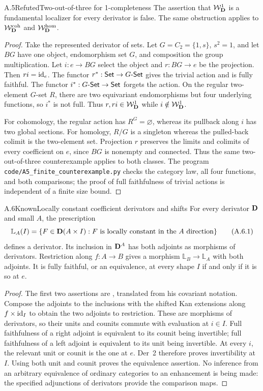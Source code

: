 \begin{claim}{A.5}{Refuted}{Two-out-of-three for 1-completeness}
The assertion that $\mathcal W_{\mathbf D}^{1}$ is a fundamental localizer for every
derivator is false. The same obstruction applies to $\mathcal W_{\mathbf D}^{\mathrm{coh}}$ and
$\mathcal W_{\mathbf D}^{\mathrm{hom}}$.
\end{claim}
\begin{proof}
Take the represented derivator of sets. Let $G=C_2=\{1,s\}$,
$s^2=1$, and let $BG$ have one object, endomorphism set $G$, and
composition the group multiplication. Let $i:e\to BG$ select the
object and $r:BG\to e$ be the projection. Then $ri=\mathrm{id}_e$.
The functor $r^*:\mathsf{Set}\to G\text{-}\mathsf{Set}$ gives the trivial action
and is fully faithful. The functor $i^*:G\text{-}\mathsf{Set}\to\mathsf{Set}$
forgets the action. On the regular two-element $G$-set $R$, there are
two equivariant endomorphisms but four underlying functions, so $i^*$
is not full. Thus $r,ri\in\mathcal W_{\mathbf D}^{1}$ while $i\notin\mathcal W_{\mathbf D}^{1}$.

For cohomology, the regular action has $R^G=\varnothing$, whereas
its pullback along $i$ has two global sections. For homology,
$R/G$ is a singleton whereas the pulled-back colimit is the two-element
set. Projection $r$ preserves the limits and colimits of every
coefficient on $e$, since $BG$ is nonempty and connected. Thus the same
two-out-of-three counterexample applies to both classes. The program
\texttt{code/A5\_finite\_counterexample.py} checks the category law,
all four functions, and both comparisons; the proof of full
faithfulness of trivial actions is independent of a finite size bound.
\end{proof}

\begin{claim}{A.6}{Known}{Locally constant coefficient derivators and shifts}
For every derivator $\mathbf D$ and small $A$, the prescription
\[
 \mathbb L_A(I)=
 \{F\in\mathbf D(A\times I):F\text{ is locally constant in the }A
 \text{ direction}\}
 \tag{A.6.1}
\]
defines a derivator. Its inclusion in $\mathbf D^{A}$ has both adjoints as
morphisms of derivators. Restriction along $f:A\to B$ gives a
morphism $\mathbb L_B\to\mathbb L_A$ with both adjoints.
It is fully faithful, or an equivalence, at every shape $I$ if and
only if it is so at $e$.
\end{claim}
\begin{proof}
The first two assertions are
\citet[Theorem~3.13]{Cisinski2009LocallyConstant}, translated from his covariant
notation. Compose the adjoints to the inclusions with the shifted Kan
extensions along $f\times\mathrm{id}_I$ to obtain the two adjoints to
restriction. These are morphisms of derivators, so their units and
counits commute with evaluation at $i\in I$. Full faithfulness of a
right adjoint is equivalent to its counit being invertible; full
faithfulness of a left adjoint is equivalent to its unit being
invertible. At every $i$, the relevant unit or counit is the one at
$e$. Der~2 therefore proves invertibility at $I$. Using both unit and
counit proves the equivalence assertion. No inference from an
arbitrary equivalence of ordinary categories to an enhancement is
being made: the specified adjunctions of derivators provide the
comparison maps.
\end{proof}

